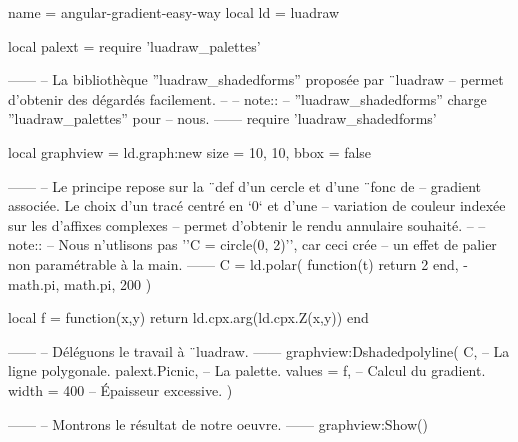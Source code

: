 \documentclass{standalone}
\begin{document}
\begin{luadraw*}{name = angular-gradient-easy-way}
local ld = luadraw

local palext = require 'luadraw_palettes'

------
-- La bibliothèque ''luadraw_shadedforms'' proposée par ¨luadraw
-- permet d'obtenir des dégardés facilement.
--
-- note::
--     ''luadraw_shadedforms'' charge ''luadraw_palettes'' pour
--     nous.
------
require 'luadraw_shadedforms'

local graphview = ld.graph:new{
  size = {10, 10},
  bbox = false
}

------
-- Le principe repose sur la ¨def d'un cercle et d'une ¨fonc de
-- gradient associée. Le choix d'un tracé centré en `0` et d'une
-- variation de couleur indexée sur les \arg d'affixes complexes
-- permet d'obtenir le rendu annulaire souhaité.
--
-- note::
--     Nous n'utlisons pas ''C = circle(0, 2)'', car ceci crée
--     un effet de palier non paramétrable à la main.
------
C = ld.polar(
  function(t)
    return 2
  end,
  -math.pi, math.pi,
  200
)

local f = function(x,y)
  return ld.cpx.arg(ld.cpx.Z(x,y))
end

------
-- Déléguons le travail à ¨luadraw.
------
graphview:Dshadedpolyline(
  C,              -- La ligne polygonale.
  palext.Picnic,      -- La palette.
  {
    values = f,   -- Calcul du gradient.
    width  = 400  -- Épaisseur excessive.
  }
)

------
-- Montrons le résultat de notre oeuvre.
------
graphview:Show()
\end{luadraw*}
\end{document}
